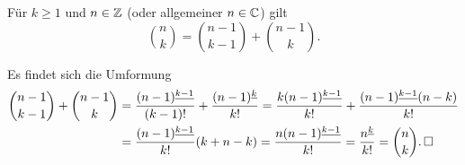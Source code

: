 \begin{Satz}
Für $k\ge 1$ und $n\in\mathbb Z$ (oder allgemeiner $n\in\mathbb C$) gilt
\[\binom{n}{k} = \binom{n-1}{k-1} + \binom{n-1}{k}.\]
\end{Satz}
\begin{Beweis}
Es findet sich die Umformung
\begin{align*}
\binom{n-1}{k-1} + \binom{n-1}{k}
&= \frac{(n-1)^{\underline{k-1}}}{(k-1)!} + \frac{(n-1)^{\underline k}}{k!}
= \frac{k(n-1)^{\underline{k-1}}}{k!} + \frac{(n-1)^{\underline{k-1}}(n-k)}{k!}\\
&= \frac{(n-1)^{\underline{k-1}}}{k!}(k + n -k)
= \frac{n(n-1)^{\underline{k-1}}}{k!}
= \frac{n^{\underline k}}{k!} = \binom{n}{k}.\,\square
\end{align*}
\end{Beweis}
